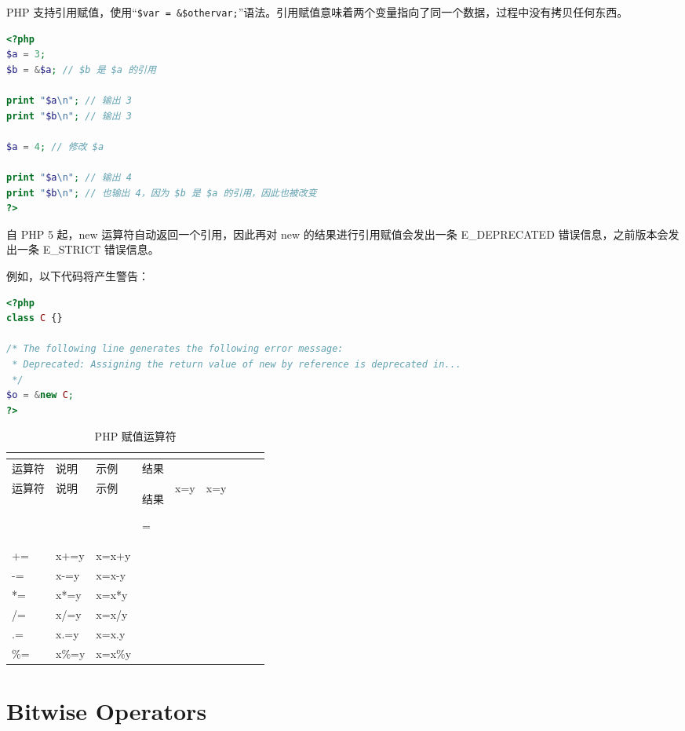 PHP 支持引用赋值，使用“\texttt{\$var = \&\$othervar;}”语法。引用赋值意味着两个变量指向了同一个数据，过程中没有拷贝任何东西。

\begin{lstlisting}[language=PHP]
<?php
$a = 3;
$b = &$a; // $b 是 $a 的引用

print "$a\n"; // 输出 3
print "$b\n"; // 输出 3

$a = 4; // 修改 $a

print "$a\n"; // 输出 4
print "$b\n"; // 也输出 4，因为 $b 是 $a 的引用，因此也被改变
?>
\end{lstlisting}

自 PHP 5 起，new 运算符自动返回一个引用，因此再对 new 的结果进行引用赋值会发出一条 E\_DEPRECATED 错误信息，之前版本会发出一条 E\_STRICT 错误信息。

例如，以下代码将产生警告：

\begin{lstlisting}[language=PHP]
<?php
class C {}

/* The following line generates the following error message:
 * Deprecated: Assigning the return value of new by reference is deprecated in...
 */
$o = &new C;
?>
\end{lstlisting}

\begin{longtable}{|m{35pt}|m{180pt}|m{80pt}|m{30pt}|}
\tabularnewline\hline
运算符	&说明	&示例	&结果
\endhead

\caption{PHP 赋值运算符}\\
\hline
运算符	&说明	&示例	&结果
\endfirsthead

\endfoot

\endlastfoot
\hline
=		&x=y		&x=y&\\
\hline
+\/=	&x+\/=y	&x=x+y&\\
\hline
-\/=		&x-\/=y		&x=x-y&\\
\hline
*\/=	&x*\/=y	&x=x*y&\\
\hline
/\/=		&x/\/=y		&x=x/y&\\
\hline
.\/=		&x.\/=y		&x=x.y&\\
\hline
\%\/=	&x\%\/=y	&x=x\%y&\\
\hline
\end{longtable}

\section{Bitwise Operators}


